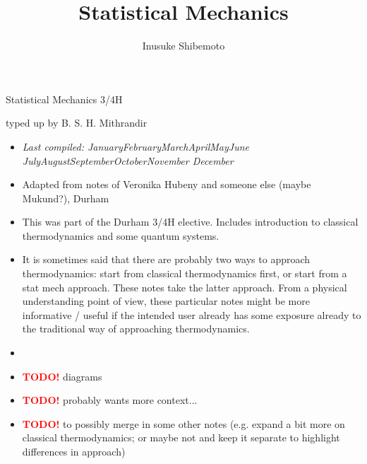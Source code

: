 \documentclass[letter-paper]{tufte-book}
\title{Statistical Mechanics}
\author[]{Inusuke Shibemoto}
\newcommand{\monthyear}{%
  \ifcase\month\or January\or February\or March\or April\or May\or June\or
  July\or August\or September\or October\or November\or
  December\fi\space\number\year
}
\newcommand{\TODO}{\textcolor{red}{\bf TODO!}\xspace}
\begin{document}



\chapter*{}

\begin{fullwidth}

\par \begin{center}{\Huge Statistical Mechanics 3/4H}\end{center}

\vspace*{5mm}

\par \begin{center}{\Large typed up by B. S. H. Mithrandir}\end{center}

\vspace*{5mm}

\begin{itemize}
  \item \textit{Last compiled: \monthyear}
  \item Adapted from notes of Veronika Hubeny and someone else (maybe Mukund?), Durham
  \item This was part of the Durham 3/4H elective. Includes introduction to
  classical thermodynamics and some quantum systems.
  \item It is sometimes said that there are probably two ways to approach
  thermodynamics: start from classical thermodynamics first, or start from a
  stat mech approach. These notes take the latter approach. From a physical
  understanding point of view, these particular notes might be more informative
  / useful if the intended user already has some exposure already to the
  traditional way of approaching thermodynamics.
  \item[]
  \item \TODO diagrams
  \item \TODO probably wants more context...
  \item \TODO to possibly merge in some other notes (e.g. expand a bit more on
  classical thermodynamics; or maybe not and keep it separate to highlight
  differences in approach)
\end{itemize}


\end{fullwidth}
\end{document}

